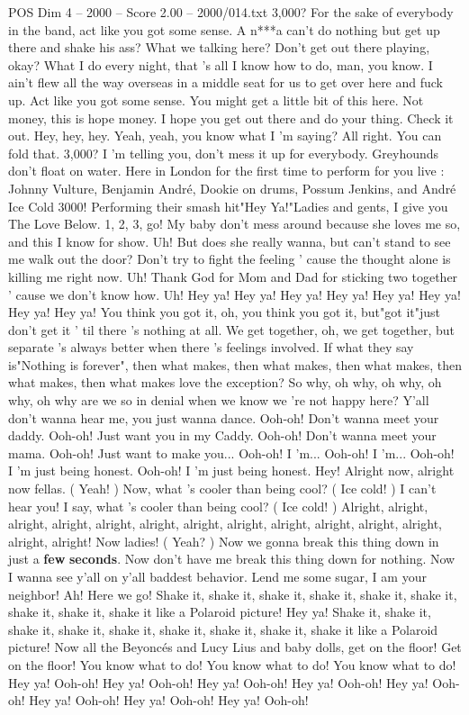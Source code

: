 \begin{textsample}{POS Dim 4 – 2000 – Score 2.00 – 2000/014.txt}  \label{ex:f4_pos_017}
3,000?
For the sake of everybody in the band, act like you got some sense.
A n***a can't do nothing but get up there and shake his ass?
What we talking here?
Don't get out there playing, okay?
What I do every night, that 's all I know how to do, man, you know.
I ain't flew all the way overseas in a middle seat for us to get over here and fuck up.
Act like you got some sense.
You might get a little bit of this here.
Not money, this is hope money.
I hope you get out there and do your thing.
Check it out.
Hey, hey, hey.
Yeah, yeah, you know what I 'm saying?
All right.
You can fold that. 3,000?
I 'm telling you, don't mess it up for everybody.
Greyhounds don't float on water.
Here in London for the first time to perform for you live : Johnny Vulture, Benjamin André, Dookie on drums, Possum Jenkins, and André Ice Cold 3000!
Performing their smash hit"Hey Ya!"Ladies and gents, I give you The Love Below. 1, 2, 3, go!
My baby don't mess around because she loves me so, and this I know for show.
Uh!
But does she really wanna, but can't stand to see me walk out the door?
Don't try to fight the feeling ' cause the thought alone is killing me right now.
Uh!
Thank God for Mom and Dad for sticking two together ' cause we don't know how.
Uh!
Hey ya!
Hey ya!
Hey ya!
Hey ya!
Hey ya!
Hey ya!
Hey ya!
Hey ya!
You think you got it, oh, you think you got it, but"got it"just don't get it ' til there 's nothing at all.
We get together, oh, we get together, but separate 's always better when there 's feelings involved.
If what they say is"Nothing is forever", then what makes, then what makes, then what makes, then what makes, then what makes love the exception?
So why, oh why, oh why, oh why, oh why are we so in denial when we know we 're not happy here?
Y'all don't wanna hear me, you just wanna dance.
Ooh-oh!
Don't wanna meet your daddy.
Ooh-oh!
Just want you in my Caddy.
Ooh-oh!
Don't wanna meet your mama.
Ooh-oh!
Just want to make you...
Ooh-oh!
I 'm...
Ooh-oh!
I 'm...
Ooh-oh!
I 'm just being honest.
Ooh-oh!
I 'm just being honest.
Hey!
Alright now, alright now fellas. ( Yeah! ) Now, what 's cooler than being cool? ( Ice cold! ) I can't hear you!
I say, what 's cooler than being cool? ( Ice cold! ) Alright, alright, alright, alright, alright, alright, alright, alright, alright, alright, alright, alright, alright, alright!
Now ladies! ( Yeah? ) Now we gonna break this thing down in just a \textbf{few} \textbf{seconds}.
Now don't have me break this thing down for nothing.
Now I wanna see y'all on y'all baddest behavior.
Lend me some sugar, I am your neighbor!
Ah!
Here we go!
Shake it, shake it, shake it, shake it, shake it, shake it, shake it, shake it, shake it like a Polaroid picture!
Hey ya!
Shake it, shake it, shake it, shake it, shake it, shake it, shake it, shake it, shake it like a Polaroid picture!
Now all the Beyoncés and Lucy Lius and baby dolls, get on the floor!
Get on the floor!
You know what to do!
You know what to do!
You know what to do!
Hey ya!
Ooh-oh!
Hey ya!
Ooh-oh!
Hey ya!
Ooh-oh!
Hey ya!
Ooh-oh!
Hey ya!
Ooh-oh!
Hey ya!
Ooh-oh!
Hey ya!
Ooh-oh!
Hey ya!
Ooh-oh!

\end{textsample}
